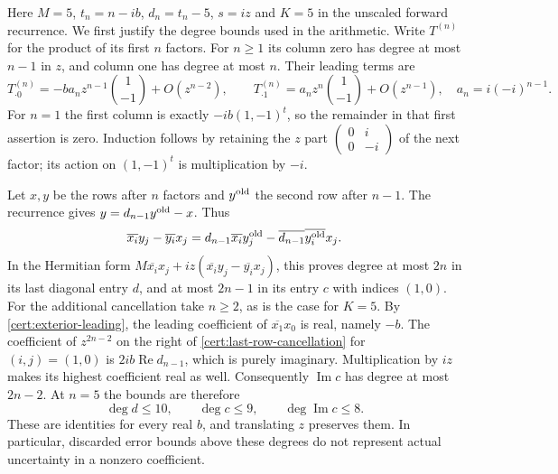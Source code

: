 \documentclass[11pt]{article}
\numberwithin{equation}{section}
\theoremstyle{definition}
\theoremstyle{remark}
\begin{document}
Here $M=5$, $t_n=n-ib$, $d_n=t_n-5$, $s=iz$ and $K=5$ in
the unscaled forward recurrence.  We first justify the degree bounds
used in the arithmetic.  Write $T^{(n)}$ for the product of its first
$n$ factors.  For $n\ge1$ its column zero has degree at most $n-1$
in $z$, and column one has degree at most $n$.  Their leading terms are
\begin{equation}\label{cert:exterior-leading}
 T^{(n)}_{\cdot0}=-b a_nz^{n-1}\binom{1}{-1}
     +O(z^{n-2}),\qquad
 T^{(n)}_{\cdot1}=a_nz^n\binom{1}{-1}+O(z^{n-1}),
 \quad a_n=i(-i)^{n-1}.
\end{equation}
For $n=1$ the first column is exactly $-ib(1,-1)^t$, so the
remainder in that first assertion is zero.  Induction follows by
retaining the $z$ part
$\left(\begin{smallmatrix}0&i\\0&-i\end{smallmatrix}\right)$
of the next factor; its action on $(1,-1)^t$ is multiplication by
$-i$.

Let $x,y$ be the rows after $n$ factors and $y^{\rm old}$ the second
row after $n-1$.  The recurrence gives
$y=d_{n-1}y^{\rm old}-x$.  Thus
\begin{equation}\label{cert:last-row-cancellation}
 \overline{x_i}y_j-\overline{y_i}x_j
 =d_{n-1}\overline{x_i}y_j^{\rm old}
  -\overline{d_{n-1}}\overline{y_i^{\rm old}}x_j.
\end{equation}
In the Hermitian form
$M\overline{x_i}x_j+iz(\overline{x_i}y_j-\overline{y_i}x_j)$,
this proves degree at most $2n$ in its last diagonal entry $d$,
and at most $2n-1$ in its entry $c$ with indices $(1,0)$.
For the additional cancellation take $n\ge2$, as is the case for
$K=5$.  By
\eqref{cert:exterior-leading}, the leading coefficient of
$\overline{x_1}x_0$ is real, namely $-b$.  The coefficient of
$z^{2n-2}$ on the right of
\eqref{cert:last-row-cancellation} for $(i,j)=(1,0)$ is
$2ib\operatorname{Re}d_{n-1}$, which is purely imaginary.
Multiplication by $iz$ makes its highest coefficient real as well.
Consequently $\operatorname{Im}c$ has degree at most $2n-2$.
At $n=5$ the bounds are therefore
\begin{equation}\label{cert:exterior-degrees}
 \deg d\le10,\qquad \deg c\le9,\qquad
 \deg\operatorname{Im}c\le8.
\end{equation}
These are identities for every real $b$, and translating $z$ preserves
them.  In particular, discarded error bounds above these degrees do
not represent actual uncertainty in a nonzero coefficient.
\end{document}
